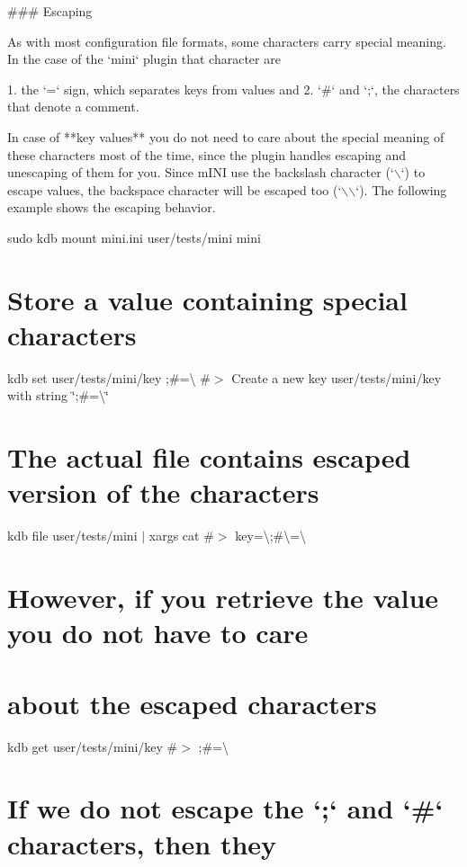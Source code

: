\begin{DoxyCode}
### Escaping

As with most configuration file formats, some characters carry special meaning. In the case of the `mini`
       plugin that character are

1. the `=` sign, which separates keys from values and
2. `#` and `;`, the characters that denote a comment.

In case of **key values** you do not need to care about the special meaning of these characters most of the
       time, since the plugin handles escaping and unescaping of them for you. Since mINI use the backslash
       character (`\(\backslash\)`) to escape values, the backspace character will be escaped too (`\(\backslash\)\(\backslash\)`). The following example shows
       the escaping behavior.
\end{DoxyCode}
 sudo kdb mount mini.\+ini user/tests/mini mini\hypertarget{autotoc_md404_autotoc_md414}{}\section{Store a value containing special characters}\label{autotoc_md404_autotoc_md414}
kdb set user/tests/mini/key \textquotesingle{};\#=\textbackslash{}\textquotesingle{} \#$>$ Create a new key user/tests/mini/key with string \char`\"{};\#=\textbackslash{}\char`\"{}\hypertarget{autotoc_md404_autotoc_md415}{}\section{The actual file contains escaped version of the characters}\label{autotoc_md404_autotoc_md415}
kdb file user/tests/mini $\vert$ xargs cat \#$>$ key=\textbackslash{};\#\textbackslash{}=\textbackslash{}\hypertarget{autotoc_md404_autotoc_md416}{}\section{However, if you retrieve the value you do not have to care}\label{autotoc_md404_autotoc_md416}
\hypertarget{autotoc_md404_autotoc_md417}{}\section{about the escaped characters}\label{autotoc_md404_autotoc_md417}
kdb get user/tests/mini/key \#$>$ ;\#=\textbackslash{}\hypertarget{autotoc_md404_autotoc_md418}{}\section{If we do not escape the `;` and `\#` characters, then they}\label{autotoc_md404_autotoc_md418}
